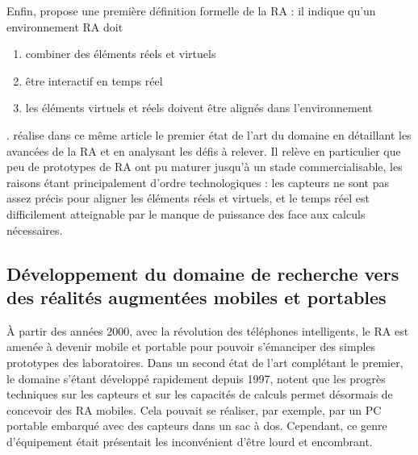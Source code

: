 Enfin, \citet{Azuma1997} propose une première définition formelle de la RA : il indique qu'un environnement RA doit 
\begin{enumerate}
  \item combiner des éléments réels et virtuels
  \item être interactif en temps réel
  \item les éléments virtuels et réels doivent être alignés dans l'environnement
\end{enumerate}.
\citeauthor{Azuma1997} réalise dans ce même article le premier état de l'art du domaine en détaillant les avancées de la RA et en analysant les défis à relever. Il relève en particulier que peu de prototypes de RA ont pu maturer jusqu'à un stade commercialisable, les raisons étant principalement d'ordre technologiques : les capteurs ne sont pas assez précis pour aligner les éléments réels et virtuels, et le temps réel est difficilement atteignable par le manque de puissance des face aux calculs nécessaires.


\subsection{Développement du domaine de recherche vers des réalités augmentées mobiles et portables}
À partir des années 2000, avec la révolution des téléphones intelligents, le RA est amenée à devenir mobile et portable pour pouvoir s'émanciper des simples prototypes des laboratoires. Dans un second état de l'art complétant le premier, le domaine s'étant développé rapidement depuis 1997, \citet{AzumaBaillotBehringerEtAl2001} notent que les progrès techniques sur les capteurs et sur les capacités de calculs permet désormais de concevoir des RA mobiles. Cela pouvait se réaliser, par exemple, par un PC portable embarqué avec des capteurs dans un sac à dos. Cependant, ce genre d'équipement était présentait les inconvénient d'être lourd et encombrant. \citep{DeSaChurchill2013}

